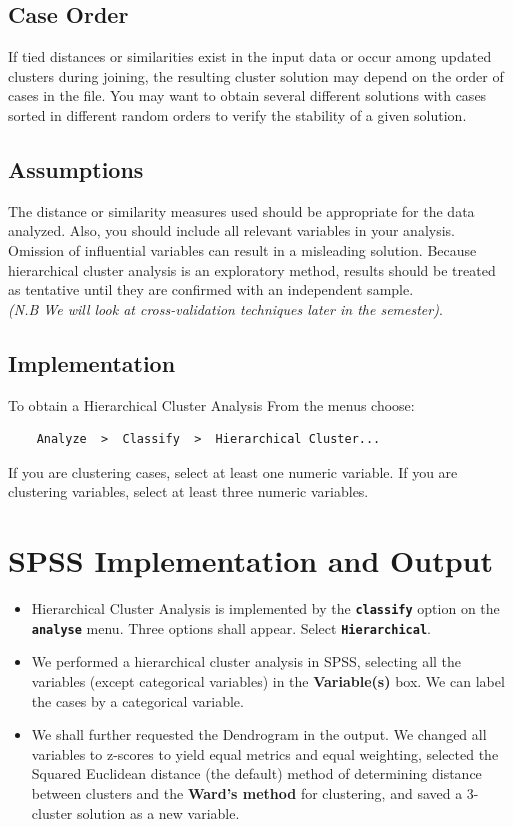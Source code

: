 \documentclass[a4paper,12pt]{article}
\begin{document}
	\subsection{Case Order} If tied distances or similarities exist in the input data or occur among updated clusters during joining, the resulting cluster solution may depend on the order of cases in the file. You may want to obtain several different solutions with cases sorted in different random orders to verify the stability of a given solution.
	\subsection{Assumptions}  The distance or similarity measures used should be appropriate for the data analyzed. Also, you should include all relevant variables in your analysis. Omission of influential variables can result in a misleading solution. Because hierarchical cluster analysis is an exploratory method, results should be treated as tentative until they are confirmed with an independent sample. \\ \textit{ (N.B We will look at cross-validation techniques later in the semester)}.
	
	
	
	\subsection{Implementation}
	
	
	To obtain a Hierarchical Cluster Analysis
	From the menus choose:
	\begin{verbatim}
	Analyze  >  Classify  >  Hierarchical Cluster...
	\end{verbatim}
	If you are clustering cases, select at least one numeric variable. If you are clustering variables, select at least three numeric variables. 
	
	
	

\section{SPSS Implementation and Output}
\begin{itemize}
	\item Hierarchical Cluster Analysis is implemented by the \textbf{\texttt{classify}} option on the \textbf{\texttt{analyse}} menu.
	Three options shall appear. Select \textbf{\texttt{Hierarchical}}.
	
\item We performed a hierarchical cluster analysis in SPSS, selecting all the variables (except categorical variables) in the \textbf{Variable(s)} box. We can label the cases by a categorical variable. 
	
\item We shall further requested the Dendrogram in the output. We changed all
	variables to z-scores to yield equal metrics and equal weighting, selected the Squared Euclidean distance
	(the default) method of determining distance between clusters and the \textbf{Ward's method} for
	clustering, and saved a 3-cluster solution as a new variable.
\end{itemize}
\end{document}
